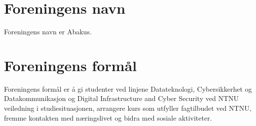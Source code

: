 \section{Foreningens navn}
Foreningens navn er Abakus.

\section{Foreningens formål}\label{sec:foreningens_formaal}
Foreningens formål er å gi studenter ved linjene Datateknologi, Cybersikkerhet og Datakommunikasjon
 og Digital Infrastructure and Cyber Security ved NTNU veiledning i studiesituasjonen, arrangere kurs som utfyller
 fagtilbudet ved NTNU, fremme kontakten med næringslivet og bidra med sosiale aktiviteter.
